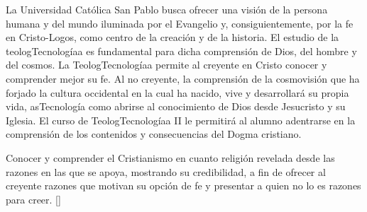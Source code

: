 \begin{syllabus}


\begin{justification}
La Universidad Católica San Pablo busca ofrecer una visión de la persona humana y del mundo iluminada por el Evangelio y, consiguientemente, por la fe en Cristo-Logos, como centro de la creación y de la historia. El estudio de la teologTecnologíaa es fundamental para dicha comprensión de Dios, del hombre y del cosmos.
La TeologTecnologíaa permite al creyente en Cristo conocer y comprender mejor su fe. Al no creyente, la comprensión de la cosmovisión que ha forjado la cultura occidental en la cual ha nacido, vive y desarrollará su propia vida, asTecnología como abrirse al conocimiento de Dios desde Jesucristo y su Iglesia.
El curso de TeologTecnologíaa II le permitirá al alumno  adentrarse en la comprensión de los contenidos y consecuencias del Dogma cristiano.
\end{justification}

\begin{goals}
\item Conocer y comprender el Cristianismo en cuanto religión revelada desde las razones en las que se apoya, mostrando su credibilidad, a fin de ofrecer al creyente razones que motivan su opción de fe y presentar a quien no lo es razones para creer. [\Usage]
\end{goals}

\begin{outcomes}
    \item {}
    \item {}
    \item {}
\end{outcomes}

\begin{competences}
    \item {}
    \item {}
    \item {}
    \item {}
    \item {}
\end{competences}


\end{syllabus}
